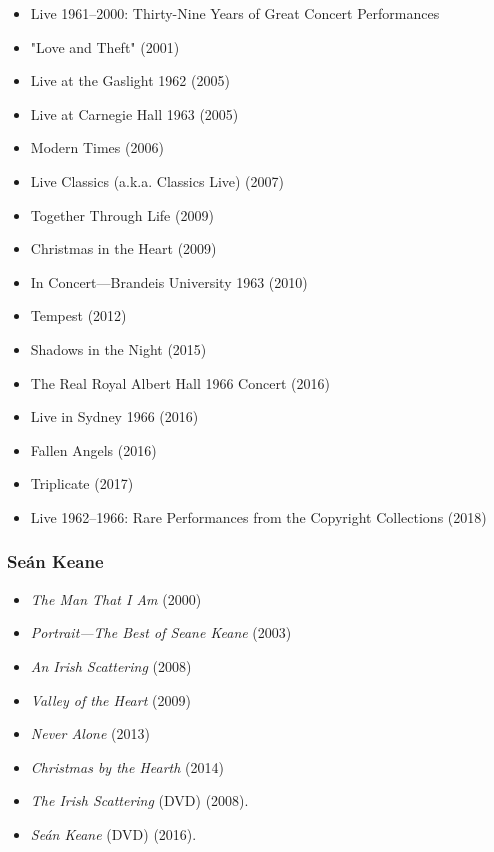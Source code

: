 \documentclass[twocolumn]{article}
\begin{document}
\begin{itemize}
\item Live 1961--2000: Thirty-Nine Years of Great Concert Performances
\item "Love and Theft" (2001)
\item Live at the Gaslight 1962 (2005)
\item Live at Carnegie Hall 1963 (2005)
\item Modern Times (2006)
\item Live Classics (a.k.a. Classics Live) (2007)
\item Together Through Life (2009)
\item Christmas in the Heart (2009)
\item In Concert---Brandeis University 1963 (2010)
\item Tempest (2012)
\item Shadows in the Night (2015)
\item The Real Royal Albert Hall 1966 Concert (2016)
\item Live in Sydney 1966 (2016)
\item Fallen Angels (2016)
\item Triplicate (2017)
\item Live 1962--1966: Rare Performances from the Copyright Collections (2018)

\end{itemize}

\subsubsection{Se\'an Keane}

\begin{itemize}

\item\emph{The Man That I Am} (2000)
\item\emph{Portrait---The Best of Seane Keane} (2003)
\item\emph{An Irish Scattering} (2008)
\item\emph{Valley of the Heart} (2009)
\item\emph{Never Alone} (2013)
\item\emph{Christmas by the Hearth} (2014)

\item\emph{The Irish Scattering} (DVD) (2008).
\item\emph{Se\'an Keane} (DVD) (2016).

\end{itemize}
\end{document}
